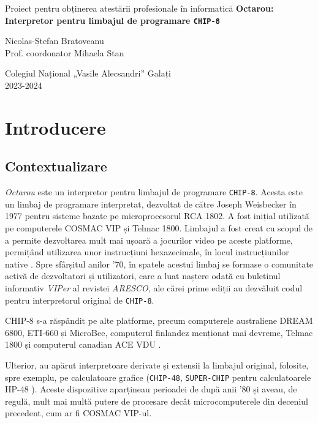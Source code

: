 \documentclass[a4paper]{article}
\begin{document}
\begin{titlepage}
	\begin{center}
		\Large Proiect pentru obținerea atestării profesionale în informatică
		\vfill
		\LARGE\textbf{Octarou: Interpretor pentru limbajul de programare \texttt{CHIP-8}}

		\vspace{8pt}
		\Large Nicolas-Ștefan Bratoveanu \\
		\large Prof. coordonator Mihaela Stan

		\vfill
		\Large
		Colegiul Național „Vasile Alecsandri” Galați \\
		2023-2024
	\end{center}
\end{titlepage}
\shipout\null

\tableofcontents
\newpage

\section{Introducere}
\subsection{Contextualizare}
\textit{Octarou} este un interpretor pentru limbajul de programare \texttt{CHIP-8}. Acesta este un limbaj de programare interpretat, dezvoltat
de către Joseph Weisbecker în 1977 pentru sisteme bazate pe microprocesorul RCA 1802. A fost inițial utilizată pe computerele COSMAC VIP și Telmac
1800. Limbajul a fost creat cu scopul de a permite dezvoltarea mult mai ușoară a jocurilor video pe aceste platforme, permițând utilizarea unor
instrucțiuni hexazecimale, în locul instrucțiunilor native \cite{langhoff}. Spre sfârșitul anilor '70, în spatele acestui limbaj se formase o comunitate activă
de dezvoltatori și utilizatori, care a luat naștere odată cu buletinul informativ \textit{VIPer} al revistei \textit{ARESCO}, ale cărei prime
ediții au dezvăluit codul pentru interpretorul original de \texttt{CHIP-8}.

CHIP-8 s-a răspândit pe alte platforme, precum computerele australiene DREAM 6800, ETI-660 și MicroBee, computerul finlandez menționat mai devreme,
Telmac 1800 și computerul canadian ACE VDU \cite{langhoff}.

Ulterior, au apărut interpretoare derivate și extensii la limbajul original, folosite, spre exemplu, pe calculatoare grafice (\texttt{CHIP-48}, \texttt{SUPER-CHIP}
pentru calculatoarele HP-48 \cite{langhoff}). Aceste dispozitive aparțineau perioadei de după anii '80 și aveau, de regulă, mult mai multă putere de procesare
decât microcomputerele din deceniul precedent, cum ar fi COSMAC VIP-ul.
\end{document}
